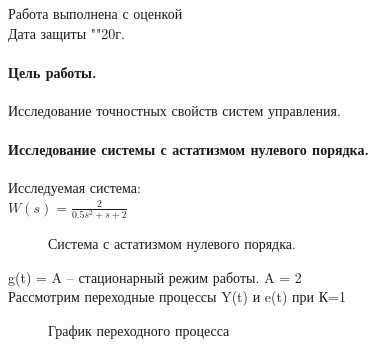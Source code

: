 \documentclass[a4paper, 11pt]{article}
\begin{document}
\begin{titlepage}
		Работа выполнена с оценкой \hspace{0.5cm} \underline{\hspace{10cm}} \\ 
		\vspace{1cm}
		Дата защиты "\underline{\hspace{0.4cm}}"\hspace{0.1cm}\underline{\hspace{1.5cm}}\hspace{0.1cm}20\underline{\hspace{0.4cm}}г.
		
	\end{titlepage}
\paragraph{Цель работы.}Исследование точностных свойств систем управления.
\paragraph{Исследование системы с астатизмом нулевого порядка.}Исследуемая система:\\
\large{$W(s)= \frac {2} {0.5s^2+s+2}$}

\begin{figure}[h]
    \caption{Система с астатизмом нулевого порядка.}
    \label{one}
\end{figure}

g(t) = A – стационарный режим работы. A = 2\\

Рассмотрим переходные процессы Y(t) и e(t) при К=1

\begin{figure}[h!]
    \caption{График переходного процесса}
    \label{two}
\end{figure}
\end{document}
